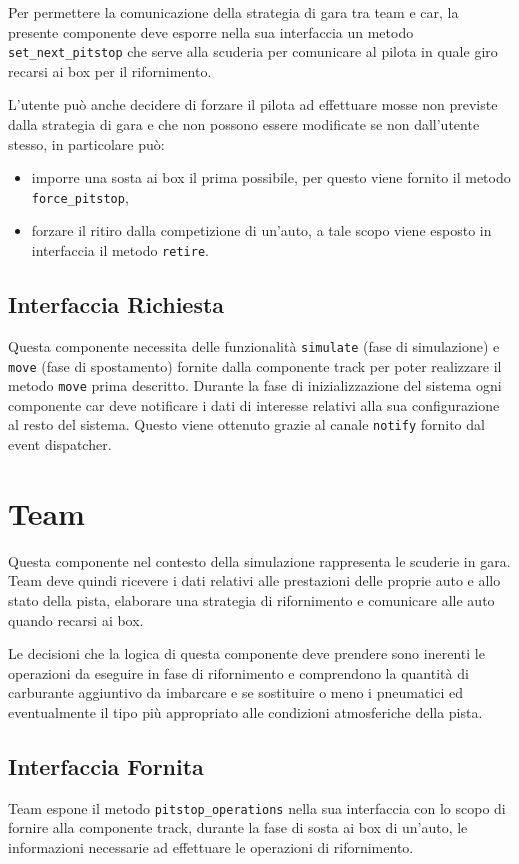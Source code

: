 \documentclass[11pt,a4paper]{report}
\newcommand{\fun}[1]{\texttt{#1}}
\begin{document}
Per permettere la comunicazione della strategia di gara tra team e car, la presente componente deve esporre nella sua interfaccia un metodo \fun{set\_next\_pitstop} che serve alla scuderia per comunicare al pilota in quale giro recarsi ai box per il rifornimento.

L'utente può anche decidere di forzare il pilota ad effettuare mosse non previste dalla strategia di gara e che non possono essere modificate se non dall'utente stesso, in particolare può:
\begin{itemize}
\item imporre una sosta ai box il prima possibile, per questo viene fornito il metodo \fun{force\_pitstop},
\item forzare il ritiro dalla competizione di un'auto, a tale scopo viene esposto in interfaccia il metodo \fun{retire}.
\end{itemize}
\subsection*{Interfaccia Richiesta}
Questa componente necessita delle funzionalità \fun{simulate} (fase di simulazione) e \fun{move} (fase di spostamento) fornite dalla componente track per poter realizzare il metodo \fun{move} prima descritto.
Durante la fase di inizializzazione del sistema ogni componente car deve notificare i dati di interesse relativi alla sua configurazione al resto del sistema. Questo viene ottenuto grazie al canale \fun{notify} fornito dal event dispatcher.
\section{Team}
Questa componente nel contesto della simulazione rappresenta le scuderie in gara. Team deve quindi ricevere i dati relativi alle prestazioni delle proprie auto e allo stato della pista, elaborare una strategia di rifornimento e comunicare alle auto quando recarsi ai box.

Le decisioni che la logica di questa componente deve prendere sono inerenti le operazioni da eseguire in fase di rifornimento e comprendono la quantità di carburante aggiuntivo da imbarcare e se sostituire o meno i pneumatici ed eventualmente il tipo più appropriato alle condizioni atmosferiche della pista.
\subsection*{Interfaccia Fornita}
Team espone il metodo \fun{pitstop\_operations} nella sua interfaccia con lo scopo di fornire alla componente track, durante la fase di sosta ai box di un'auto, le informazioni necessarie ad effettuare le operazioni di rifornimento.
\end{document}

